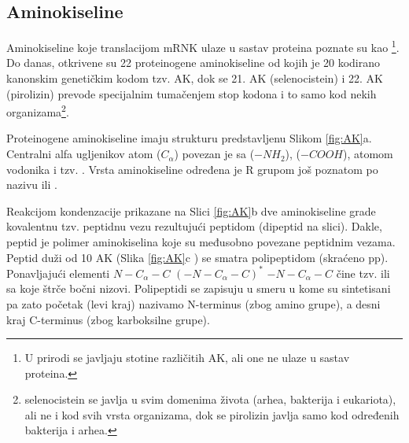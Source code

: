 \subsection{Aminokiseline}
Aminokiseline koje translacijom mRNK ulaze u sastav proteina poznate su kao
\footnote{U prirodi se javljaju stotine različitih AK, ali
one ne ulaze u sastav proteina.}.  Do danas, otkrivene su 22 proteinogene
aminokiseline od kojih je 20 kodirano kanonskim genetičkim kodom tzv.
 AK, dok se 21. AK (selenocistein) i 22. AK (pirolizin)
prevode specijalnim tumačenjem stop kodona i to samo kod nekih organizama\footnote{
  selenocistein se javlja u svim domenima života (arhea, bakterija i
  eukariota), ali ne i kod svih vrsta organizama, dok se pirolizin javlja samo
kod određenih bakterija i arhea.}. 

Proteinogene aminokiseline imaju strukturu predstavljenu Slikom \ref{fig:AK}a.
Centralni alfa ugljenikov atom ($C_{\alpha}$) povezan je sa  ($-NH_2$), 
 ($-COOH$), atomom vodonika i tzv. .
Vrsta aminokiseline određena je R grupom još poznatom po nazivu  ili  .

Reakcijom kondenzacije prikazane na Slici \ref{fig:AK}b dve aminokiseline grade
kovalentnu tzv. peptidnu vezu rezultujući peptidom (dipeptid na slici).  Dakle,
peptid je polimer aminokiselina koje su međusobno povezane peptidnim vezama.
Peptid duži od 10 AK (Slika \ref{fig:AK}c ) se smatra polipeptidom (skraćeno
pp).
Ponavljajući elementi $N-C_\alpha-C$
$(-N-C_\alpha-C)^*$ $-N-C_\alpha-C$ čine tzv.   ili
 sa koje štrče bočni nizovi.  Polipeptidi se zapisuju u
smeru u kome su sintetisani pa zato  početak (levi kraj) nazivamo N-terminus
(zbog amino grupe), a desni kraj C-terminus (zbog
karboksilne grupe).


